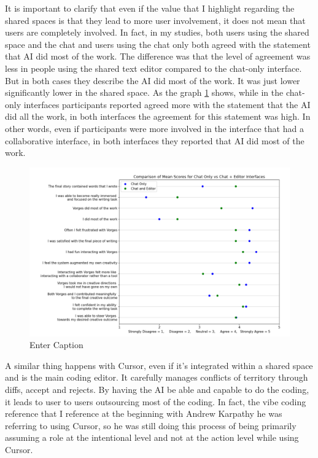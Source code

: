 It is important to clarify that even if the value that I highlight regarding the shared spaces is that they lead to more user involvement, it does not mean that users are completely involved. In fact, in my studies, both users using the shared space and the chat and users using the chat only both agreed with the statement that AI did most of the work. The difference was that the level of agreement was less in people using the shared text editor compared to the chat-only interface. But in both cases they describe the AI did most of the work. It was just lower significantly lower in the shared space. As the graph \ref{fig:graphsharedspaces} shows, while in the chat-only interfaces participants reported agreed more with the statement that the AI did all the work, in both interfaces the agreement for this statement was high. In other words, even if participants were more involved in the interface that had a collaborative interface, in both interfaces they reported that AI did most of the work. 


\begin{figure}
    \centering
    \includegraphics[width=1\linewidth]{graphsharedspaces.png}
    \caption{Enter Caption}
    \label{fig:graphsharedspaces}
\end{figure}

A similar thing happens with Cursor, even if it's integrated within a shared space and is the main coding editor. It carefully manages conflicts of territory through diffs, accept and rejects. By having the AI be able and capable to do the coding, it leads to user to users outsourcing most of the coding. In fact, the vibe coding reference that I reference at the beginning with Andrew Karpathy he was referring to using Cursor, so he was still doing this process of being primarily assuming a role at the intentional level and not at the action level while using Cursor. 

